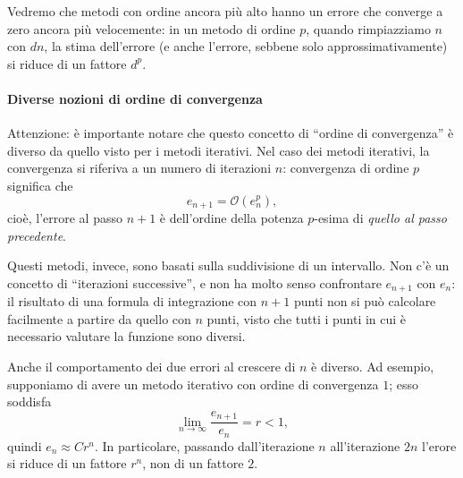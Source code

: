 \documentclass[a4paper]{report}
\theoremstyle{definiton}
\theoremstyle{remark}
\begin{document}
Vedremo che metodi con ordine ancora più alto hanno un errore che converge a zero ancora più velocemente: in un metodo di ordine $p$, quando rimpiazziamo $n$ con $d n$, la stima dell'errore (e anche l'errore, sebbene solo approssimativamente) si riduce di un fattore $d^p$.

\paragraph{Diverse nozioni di ordine di convergenza}
Attenzione: è importante notare che questo concetto di ``ordine di convergenza'' è diverso da quello visto per i metodi iterativi. Nel caso dei metodi iterativi, la convergenza si riferiva a un numero di iterazioni $n$: convergenza di ordine $p$ significa che
\[
e_{n+1} = \mathcal{O}(e_n^p),
\]
cioè, l'errore al passo $n+1$ è dell'ordine della potenza $p$-esima di \emph{quello al passo precedente}.

Questi metodi, invece, sono basati sulla suddivisione di un intervallo. Non c'è un concetto di ``iterazioni successive'', e non ha molto senso confrontare $e_{n+1}$ con $e_n$: il risultato di una formula di integrazione con $n+1$ punti non si può calcolare facilmente a partire da quello con $n$ punti, visto che tutti i punti in cui è necessario valutare la funzione sono diversi.

Anche il comportamento dei due errori al crescere di $n$ è diverso. Ad esempio, supponiamo di avere un metodo iterativo con ordine di convergenza $1$; esso soddisfa
\[
\lim_{n\to\infty} \frac{e_{n+1}}{e_n} = r < 1,
\]
quindi $e_n \approx C r^n$. In particolare, passando dall'iterazione $n$ all'iterazione $2n$ l'erore si riduce di un fattore $r^n$, non di un fattore $2$.
\end{document}
